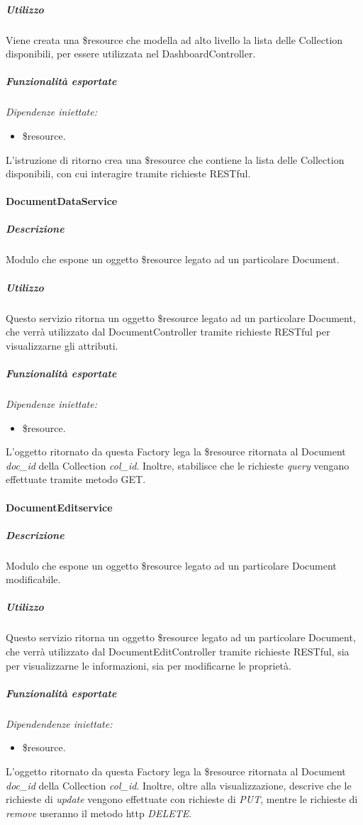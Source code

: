 \subparagraph{Utilizzo}
Viene creata una \$resource che modella ad alto livello la lista delle Collection disponibili,
per essere utilizzata nel DashboardController.

\subparagraph{Funzionalità esportate}
\emph{Dipendenze iniettate:}
\begin{itemize}
 \item \$resource.
\end{itemize}
L'istruzione di ritorno crea una \$resource che contiene la lista delle Collection disponibili, con 
cui interagire tramite richieste RESTful.

\paragraph{DocumentDataService}
\subparagraph{Descrizione}
Modulo che espone un oggetto \$resource legato ad un particolare Document.

\subparagraph{Utilizzo}
Questo servizio ritorna un oggetto \$resource legato ad un particolare Document, che verrà
utilizzato dal DocumentController tramite richieste RESTful per visualizzarne gli attributi.

\subparagraph{Funzionalità esportate}
\emph{Dipendenze iniettate:}
\begin{itemize}
 \item \$resource.
\end{itemize}
L'oggetto ritornato da questa Factory lega la \$resource ritornata al Document \emph{doc_id} della Collection
\emph{col_id}. Inoltre, stabilisce che le richieste \emph{query} vengano effettuate tramite metodo GET. 

\paragraph{DocumentEditservice}
\subparagraph{Descrizione}
Modulo che espone un oggetto \$resource legato ad un particolare Document modificabile.

\subparagraph{Utilizzo}
Questo servizio ritorna un oggetto \$resource legato ad un particolare Document, che verrà
utilizzato dal DocumentEditController tramite richieste RESTful, sia per visualizzarne
le informazioni, sia per modificarne le proprietà.

\subparagraph{Funzionalità esportate}
\emph{Dipendendenze iniettate:}
\begin{itemize}
 \item \$resource.
\end{itemize}
L'oggetto ritornato da questa Factory lega la \$resource ritornata al Document \emph{doc_id} della Collection
\emph{col_id}. Inoltre, oltre alla visualizzazione, descrive che le richieste di \emph{update} vengono effettuate
con richieste di \emph{PUT}, mentre le richieste di \emph{remove} useranno il metodo http \emph{DELETE}.


